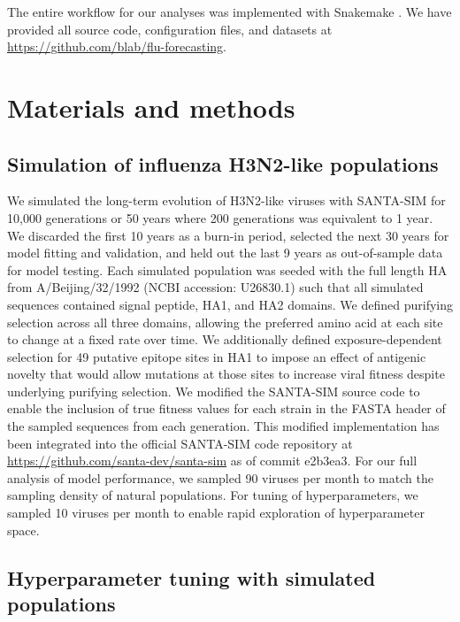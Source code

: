 The entire workflow for our analyses was implemented with Snakemake \cite{Snakemake}.
We have provided all source code, configuration files, and datasets at \href{https://github.com/blab/flu-forecasting}{https://github.com/blab/flu-forecasting}.

\section*{Materials and methods}

\subsection*{Simulation of influenza H3N2-like populations}

We simulated the long-term evolution of H3N2-like viruses with SANTA-SIM \cite{Jariani2019} for 10,000 generations or 50 years where 200 generations was equivalent to 1 year.
We discarded the first 10 years as a burn-in period, selected the next 30 years for model fitting and validation, and held out the last 9 years as out-of-sample data for model testing.
Each simulated population was seeded with the full length HA from A/Beijing/32/1992 (NCBI accession: U26830.1) such that all simulated sequences contained signal peptide, HA1, and HA2 domains.
We defined purifying selection across all three domains, allowing the preferred amino acid at each site to change at a fixed rate over time.
We additionally defined exposure-dependent selection for 49 putative epitope sites in HA1 \cite{Luksza:2014hj} to impose an effect of antigenic novelty that would allow mutations at those sites to increase viral fitness despite underlying purifying selection.
We modified the SANTA-SIM source code to enable the inclusion of true fitness values for each strain in the FASTA header of the sampled sequences from each generation.
This modified implementation has been integrated into the official SANTA-SIM code repository at \url{https://github.com/santa-dev/santa-sim} as of commit e2b3ea3.
For our full analysis of model performance, we sampled 90 viruses per month to match the sampling density of natural populations.
For tuning of hyperparameters, we sampled 10 viruses per month to enable rapid exploration of hyperparameter space.

\subsection*{Hyperparameter tuning with simulated populations}

